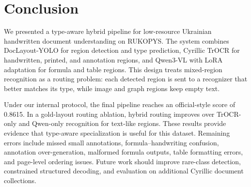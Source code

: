 \documentclass[runningheads]{llncs}
\begin{document}
\section{Conclusion}
\label{sec:conclusion}

We presented a type-aware hybrid pipeline for low-resource Ukrainian handwritten document understanding on RUKOPYS. The system combines DocLayout-YOLO for region detection and type prediction, Cyrillic TrOCR for handwritten, printed, and annotation regions, and Qwen3-VL with LoRA adaptation for formula and table regions. This design treats mixed-region recognition as a routing problem: each detected region is sent to a recognizer that better matches its type, while image and graph regions keep empty text.

Under our internal protocol, the final pipeline reaches an official-style score of 0.8615. In a gold-layout routing ablation, hybrid routing improves over TrOCR-only and Qwen-only recognition for text-like regions. These results provide evidence that type-aware specialization is useful for this dataset. Remaining errors include missed small annotations, formula--handwriting confusion, annotation over-generation, malformed formula outputs, table formatting errors, and page-level ordering issues. Future work should improve rare-class detection, constrained structured decoding, and evaluation on additional Cyrillic document collections.



\end{document}
